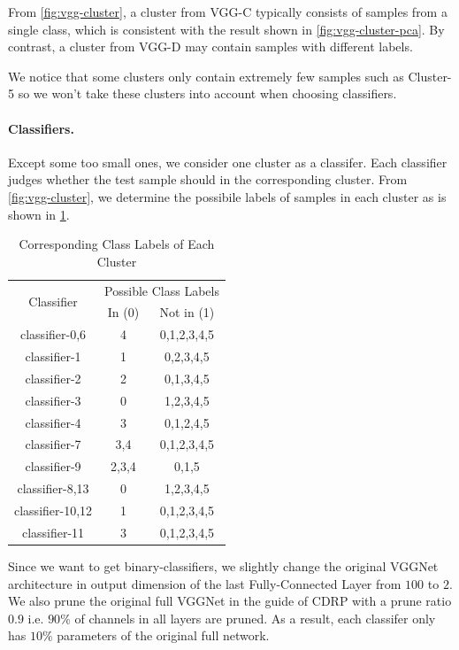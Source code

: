 \documentclass[sigplan,10pt,review]{acmart}\settopmatter{printfolios=true,printccs=false,printacmref=false}
\begin{document}
From \cref{fig:vgg-cluster}, a cluster from VGG-C typically consists of samples from a single class, which is consistent with the result shown in \cref{fig:vgg-cluster-pca}. 
By contrast, a cluster from VGG-D may contain samples with different labels.

We notice that some clusters only contain extremely few samples such as Cluster-5 so we won't take these clusters into account when choosing classifiers.

\paragraph{Classifiers.} Except some too small ones, we consider one cluster as a classifer. Each classifier judges whether the test sample should in the corresponding cluster. 
From \cref{fig:vgg-cluster}, we determine the possibile labels of samples in each cluster as is shown in \cref{tab:cluster_label}. 

\begin{table}[h]
	\caption{Corresponding Class Labels of Each Cluster}
	\label{tab:cluster_label}
	\begin{tabular}{|c|c|c|}
	\hline
	\multirow{2}{*}{Classifier} &\multicolumn{2}{|c|}{Possible Class Labels}\\
	\cline{2-3}
	& In (0) & Not in (1)\\
	\hline
	classifier-0,6 & 4 & 0,1,2,3,4,5\\
	classifier-1 & 1 & 0,2,3,4,5\\
	classifier-2 & 2 & 0,1,3,4,5\\
	classifier-3 & 0 & 1,2,3,4,5\\
	classifier-4 & 3 & 0,1,2,4,5\\
	classifier-7 & 3,4 & 0,1,2,3,4,5\\ 
	classifier-9 & 2,3,4 & 0,1,5\\ 
	classifier-8,13 & 0 & 1,2,3,4,5\\
	classifier-10,12 & 1 & 0,1,2,3,4,5\\
	classifier-11 & 3 & 0,1,2,3,4,5\\
	\hline
	\end{tabular}
\end{table}

Since we want to get binary-classifiers, we slightly change the original VGGNet architecture in output dimension of the last Fully-Connected Layer from $100$ to $2$. 
We also prune the original full VGGNet in the guide of CDRP with a prune ratio $0.9$ i.e. $90\%$ of channels in all layers are pruned. 
As a result, each classifer only has $10\%$ parameters of the original full network.
\end{document}
